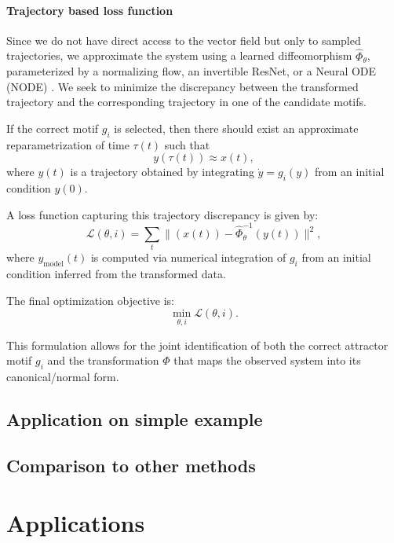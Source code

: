 \documentclass{article}
\theoremstyle{definition} \newtheorem{definition}{Definition}  \newtheorem{example}{Example}
\theoremstyle{remark} \newtheorem{remark}{Remark}
\newcounter{ct}
\begin{document}
\paragraph{Trajectory based loss function}
Since we do not have direct access to the vector field but only to sampled trajectories, we approximate the system using a learned diffeomorphism \( \hat{\Phi}_\theta \), parameterized by a normalizing flow\citep{kobyzev2020normalizing,papamakarios2021normalizing}, an invertible ResNet\citep{he2016deep}, or a Neural ODE (NODE) \citep{chen2018neural}.
 We seek to minimize the discrepancy between the transformed trajectory and the corresponding trajectory in one of the candidate motifs.

 If the correct motif \( g_i \) is selected, then there should exist an approximate reparametrization of time \( \tau(t) \) such that
\[
y(\tau(t)) \approx x(t),
\]
where \( y(t) \) is a trajectory obtained by integrating \( \dot{y} = g_i(y) \) from an initial condition \( y(0) \). %


A loss function capturing this trajectory discrepancy is given by:
\[
\mathcal{L}(\theta, i) = \sum_{t} \Big\| (x(t)) - \hat{\Phi}_\theta^{-1}(y(t)) \Big\|^2,
\]
where \( y_{\text{model}}(t) \) is computed via numerical integration of \( g_i \) from an initial condition inferred from the transformed data.

The final optimization objective is:
\[
\min_{\theta, i} \mathcal{L}(\theta, i). %
\]

This formulation allows for the joint identification of both the correct attractor motif \( g_i \) and the transformation \( \Phi \) that maps the observed system into its canonical/normal form.


\subsection{Application on simple example}

\subsection{Comparison to other methods}



\section{Applications}
\end{document}
